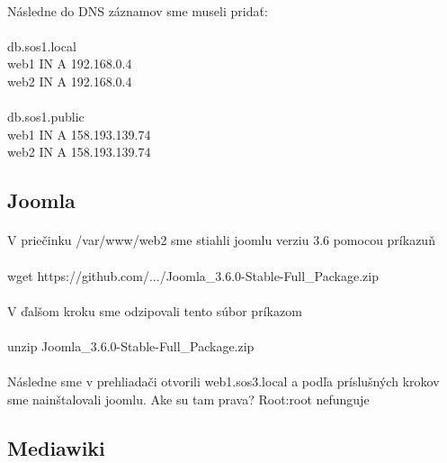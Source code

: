 \paragraph{}
Následne do DNS záznamov sme museli pridať:\\
\paragraph{}
db.sos1.local\\
web1 IN A 192.168.0.4\\
web2 IN A 192.168.0.4\\
\\
db.sos1.public\\
web1 IN A 158.193.139.74\\
web2 IN A 158.193.139.74\\

\subsection{Joomla}
\paragraph{}
V priečinku /var/www/web2 sme stiahli joomlu verziu 3.6 pomocou príkazuň\\
\paragraph{}
wget https://github.com/.../Joomla\_3.6.0-Stable-Full\_Package.zip\\
\paragraph{}
V ďalšom kroku sme odzipovali tento súbor príkazom\\
\paragraph{}
unzip Joomla\_3.6.0-Stable-Full\_Package.zip\\
\paragraph{}
Následne sme v prehliadači otvorili web1.sos3.local a podľa príslušných krokov sme nainštalovali joomlu. Ake su tam prava? Root:root nefunguje

\subsection{Mediawiki}
